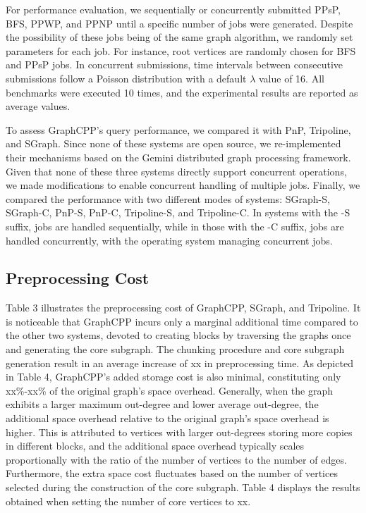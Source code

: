 \documentclass[lettersize,journal]{IEEEtran} %
\begin{document}
For performance evaluation, we sequentially or concurrently submitted PPsP, BFS, PPWP, and PPNP until a specific number of jobs were generated. Despite the possibility of these jobs being of the same graph algorithm, we randomly set parameters for each job. For instance, root vertices are randomly chosen for BFS and PPsP jobs. In concurrent submissions, time intervals between consecutive submissions follow a Poisson distribution with a default $\lambda$ value of 16. All benchmarks were executed 10 times, and the experimental results are reported as average values.

To assess GraphCPP's query performance, we compared it with PnP, Tripoline, and SGraph. Since none of these systems are open source, we re-implemented their mechanisms based on the Gemini distributed graph processing framework. Given that none of these three systems directly support concurrent operations, we made modifications to enable concurrent handling of multiple jobs. Finally, we compared the performance with two different modes of systems: SGraph-S, SGraph-C, PnP-S, PnP-C, Tripoline-S, and Tripoline-C. In systems with the -S suffix, jobs are handled sequentially, while in those with the -C suffix, jobs are handled concurrently, with the operating system managing concurrent jobs.
\subsection{Preprocessing Cost}
Table 3 illustrates the preprocessing cost of GraphCPP, SGraph, and Tripoline. It is noticeable that GraphCPP incurs only a marginal additional time compared to the other two systems, devoted to creating blocks by traversing the graphs once and generating the core subgraph. The chunking procedure and core subgraph generation result in an average increase of xx in preprocessing time. As depicted in Table 4, GraphCPP's added storage cost is also minimal, constituting only xx\%-xx\% of the original graph's space overhead. Generally, when the graph exhibits a larger maximum out-degree and lower average out-degree, the additional space overhead relative to the original graph's space overhead is higher. This is attributed to vertices with larger out-degrees storing more copies in different blocks, and the additional space overhead typically scales proportionally with the ratio of the number of vertices to the number of edges. Furthermore, the extra space cost fluctuates based on the number of vertices selected during the construction of the core subgraph. Table 4 displays the results obtained when setting the number of core vertices to xx.
\end{document}
